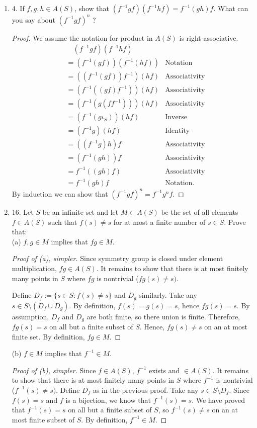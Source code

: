 \begin{enumerate}[resume]
	\item 4. If $f, g, h \in A(S)$, show that $\left(f^{-1} g f\right)\left(f^{-1} h f\right)=f^{-1}(g h) f$. What can you say about $\left(f^{-1} g f\right)^{n}$ ?
\begin{proof}
	We assume the notation for product in $A(S)$ is right-associative.
	\begin{align*}
		&\quad \left(f^{-1} g f\right)\left(f^{-1} h f\right)&\\
		&= (f^{-1} (gf)) (f^{-1} (hf))& \text{Notation}\\
		&= ((f^{-1} (gf))f^{-1}) (hf) & \text{Associativity}\\
		&= (f^{-1} ((gf)f^{-1})) (hf) & \text{Associativity}\\
		&= (f^{-1} (g(ff^{-1}))) (hf) & \text{Associativity}\\
		&= (f^{-1} (g\iota_S)) (hf) & \text{Inverse}\\
		&= (f^{-1} g) (hf) & \text{Identity}\\
		&= ((f^{-1} g) h)f & \text{Associativity}\\
		&= (f^{-1} (g h))f & \text{Associativity}\\
		&= f^{-1} ((g h)f) & \text{Associativity}\\
		&= f^{-1} (g h)f & \text{Notation}
	.\end{align*}
	By induction we can show that $(f^{-1}gf)^n = f^{-1}g^nf$.
\end{proof}
	\item 16. Let $S$ be an infinite set and let $M \subset A(S)$ be the set of all elements $f \in A(S)$ such that $f(s) \neq s$ for at most a finite number of $s \in S$. Prove that:\\
(a) $f, g \in M$ implies that $f g \in M$.
\begin{proof}[Proof of (a), simpler]
	Since symmetry group is closed under element multiplication, $fg \in A(S)$. It remains to show that there is at most finitely many points in $S$ where $fg$ is nontrivial ($fg(s) \neq s)$.

	Define $D_f := \{s \in S: f(s) \neq  s\} $ and $D_g$ similarly. Take any $s \in S\setminus \left( D_f \cup D_g \right) $. By definition, $f(s) = g(s) = s $, hence $fg(s) = s $. By assumption, $D_f$ and $D_g$ are both finite, so there union is finite. Therefore, $fg(s) = s $ on all but a finite subset of $S$. Hence, $fg(s)\neq s $ on an at most finite set. By definition, $fg \in M $.
\end{proof}
(b) $f \in M$ implies that $f^{-1} \in M$.
\begin{proof}[Proof of (b), simpler]
	Since  $f \in A(S)$, $f^{-1}$ exists and $\in  A(S)$.  It remains to show that there is at most finitely many points in $S$ where $f^{-1}$ is nontrivial ($f^{-1}(s) \neq s)$. Define $D_f$ as in the previous proof. Take any $s \in  S\setminus D_f$. Since $f(s) = s$ and $f$ is a bijection, we know that $f^{-1}(s) = s$. We have proved that $f^{-1}(s) = s$ on all but a finite subset of $S$, so $f^{-1}(s) \neq s$ on an at most finite subset of $S$. By definition, $f^{-1} \in  M $.
	

\end{proof}
\end{enumerate}
